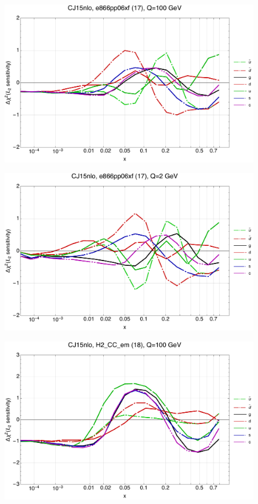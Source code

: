 \documentclass[10pt,aps,prd,floatfix,titlepage]{revtex4}
\begin{document}
\clearpage
\begin{figure}
\includegraphics[width=\textwidth,height=0.44\textheight,keepaspectratio]{1/17_CJ15nlo_L2_q100_Sf_1.pdf}
\caption{}
\end{figure}
\begin{figure}
\includegraphics[width=\textwidth,height=0.44\textheight,keepaspectratio]{1/17_CJ15nlo_L2_q2_Sf_1.pdf}
\caption{}
\end{figure}
\clearpage
\begin{figure}
\includegraphics[width=\textwidth,height=0.44\textheight,keepaspectratio]{1/18_CJ15nlo_L2_q100_Sf_1.pdf}
\caption{}
\end{figure}
\end{document}
